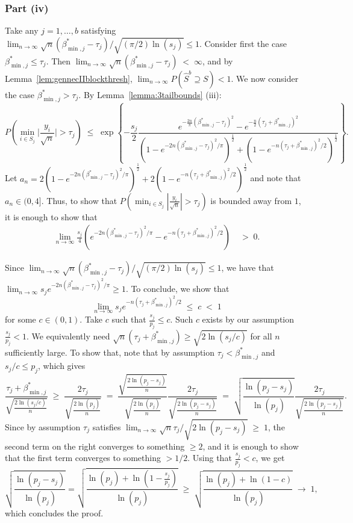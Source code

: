 \documentclass[bj,authoryear]{imsart}
\theoremstyle{plain}
\begin{document}
\subsubsection{Part (iv)}	
Take any $j=1,\ldots,b$ satisfying $\lim_{n\to \infty} \sqrt{n}(\beta_{\min,j}^*-\tau_j)/\sqrt{(\pi/2)\ln(s_j)}\leq 1$. Consider first the case $\beta^*_{\min,j}\leq\tau_j$. Then $ \lim_{n\to \infty} \sqrt{n}(\beta_{\min,j}^*-\tau_j)\; <\; \infty$, and by Lemma~\ref{lem:gennecIIblockthresh}, $\lim_{n \rightarrow \infty} P(\hat S^{b}\supseteq S  ) < 1$. We now consider the case $\beta^*_{\min,j}>\tau_j$. By Lemma~\ref{lemma:3tailbounds} (iii):
$$P\left(\min_{i \in S_j}\Big|\frac{y_i}{\sqrt{n}}\Big| > \tau_j \right)\;\leq\;
\exp\left\{-\frac{s_j}{2}\frac{e^{-\tfrac{2n}{\pi}(\beta^*_{\min,j}-\tau_j)^2}-e^{-\tfrac{n}{2}(\tau_j+\beta^*_{\min,j})^2}}{\left(1-e^{-2n(\beta^*_{\min,j}-\tau_j)^2/\pi}\right)^{\frac{1}{2}}+\left(1-e^{-n(\tau_j+\beta^*_{\min,j})^2/2}\right)^{\frac{1}{2}}}\right\}. $$
Let $a_{n}=2\left(1-e^{-2n(\beta^*_{\min,j}-\tau_j)^2/\pi}\right)^{\frac{1}{2}}+2\left(1-e^{-n(\tau_j+\beta^*_{\min,j})^2/2}\right)^{\frac{1}{2}}$ and note that $a_n\in (0, 4]$.  Thus, to show that $P\left(\min_{i \in S_j}|\tfrac{y_i}{\sqrt{n}}| > \tau_j \right)$ is bounded away from $1$, it is enough to show that 
\begin{align*}
\lim_{n\to \infty} \frac{s_j}{4}({e^{-2n(\beta^*_{\min,j}-\tau_j)^2/\pi}-e^{-n(\tau_j+\beta^*_{\min,j})^2/2}})
&\;>\;0.
\end{align*}

Since $\lim_{n\to \infty} \sqrt{n}(\beta_{\min,j}^*-\tau_j)/\sqrt{(\pi/2)\ln(s_j)}\leq 1$, we have that $\lim_{n\to\infty} {s_j} e^{-2n(\beta^*_{\min,j}-\tau_j)^2/\pi}\geq 1$. To conclude, we show that
$$
\lim_{n\to\infty} {s_j} e^{-n(\tau_j+\beta^*_{\min,j})^2/2}\;\leq\;c\;<\;1
$$ 
for some $c\in(0,1)$. Take $c$ such that $\tfrac{s_j}{p_j}\leq c$. Such $c$ exists by our assumption $\tfrac{s_j}{p_j}<1$.
We equivalently need
$\sqrt{n}(\tau_j+\beta^*_{\min,j})\geq\sqrt{{2\ln (s_j/c)}}$ for all $n$ sufficiently large. To show that, note that by assumption $\tau_j< \beta^*_{\min,j}$ and $s_j/c\leq p_j$, which gives
$$
\frac{\tau_j+\beta^*_{\min,j}}{\sqrt{\tfrac{2\ln(s_j/c)}{n}}}\;\geq\;\frac{2\tau_j}{\sqrt{\tfrac{2\ln(p_j)}{n}}}\;=\;\frac{\sqrt{\tfrac{2\ln(p_j-s_j)}{n}}}{\sqrt{\tfrac{2\ln(p_j)}{n}}}\frac{2\tau_j}{\sqrt{\tfrac{2\ln(p_j-s_j)}{n}}}\;=\;\sqrt{\frac{\ln(p_j-s_j)}{\ln(p_j)}}\frac{2\tau_j}{\sqrt{\tfrac{2\ln(p_j-s_j)}{n}}}.
$$
Since by assumption $\tau_j$ satisfies $\lim_{n\to \infty} \sqrt{n}\tau_j/\sqrt{2\ln(p_j-s_j)}\;\geq\;1$, the second term on the right converges to something $\geq 2$, and it is enough to show that the first term converges to something $>1/2$. Using that $\tfrac{s_j}{p_j}<c$, we get
$$
\sqrt{\frac{\ln(p_j-s_j)}{\ln(p_j)}}
= \sqrt{\frac{\ln(p_j) + \ln(1-\frac{s_j}{p_j})}{\ln(p_j)}}
\;\geq\;\sqrt{\frac{\ln(p_j)+\ln(1-c)}{\ln(p_j)}}\;\to\;1,
$$
which concludes the proof.
\end{document}
